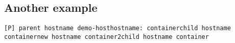 \subsection{Another example}
\begin{frame}
\begin{minipage}{0.45\textwidth}


\normalsize
\texttt{[P] parent hostname demo-host\newline
[C] hostname: container\newline
[P] child hostname container\newline
[C] new hostname container2\newline
[P] child hostname container
}
\end{minipage}
\
\begin{minipage}{0.45\textwidth}

    

    \end{minipage}
\end{frame}